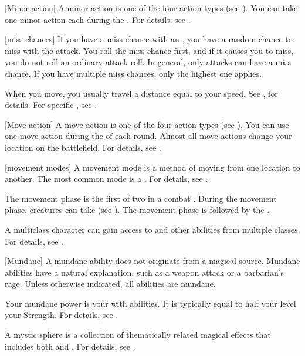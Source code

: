 [Minor action] A minor action is one of the four action types (see ).
You can take one minor action each  during the .
For details, see .

[miss chances] If you have a miss chance with an , you have a random chance to miss with the attack.
You roll the miss chance first, and if it causes you to miss, you do not roll an ordinary attack roll.
In general, only  attacks can have a miss chance.
If you have multiple miss chances, only the highest one applies.

 When you move, you usually travel a distance equal to your speed.
See , for details.
For specific , see .

[Move action] A move action is one of the four action types (see ).
You can use one move action during the  of each round.
Almost all move actions change your location on the battlefield.
For details, see .

[movement modes] A movement mode is a method of moving from one location to another.
The most common mode is a .
For details, see .

 The movement phase is the first of two  in a combat .
During the movement phase, creatures can take  (see ).
The movement phase is followed by the .

 A multiclass character can gain access to  and other abilities from multiple classes.
For details, see .

[Mundane] A mundane ability does not originate from a magical source.
Mundane abilities have a natural explanation, such as a weapon attack or a barbarian's rage.
Unless otherwise indicated, all abilities are mundane.

 Your mundane power is your  with  abilities.
It is typically equal to half your level \add your Strength.
For details, see .

 A mystic sphere is a collection of thematically related magical effects that includes both  and .
For details, see .

